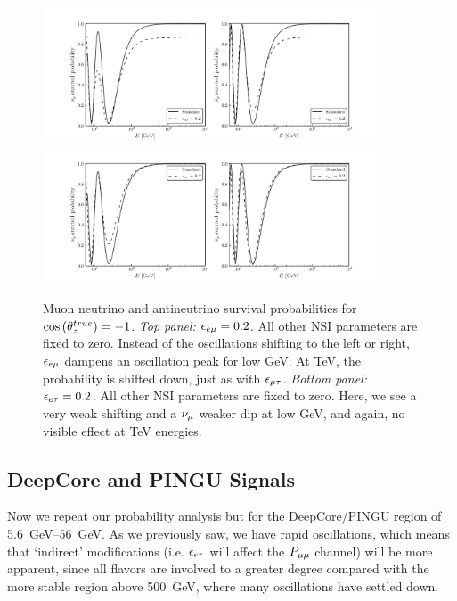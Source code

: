 \begin{figure}
    \begin{center}
        \includegraphics[width=0.9\textwidth]{figures/eem_probs.pdf}
        \includegraphics[width=0.9\textwidth]{figures/eet_probs.pdf}
        \caption{Muon neutrino and antineutrino survival probabilities for
        $\cos{(\theta_z^{true})} = -1$. \emph{Top panel:} $\epsilon_{e\mu} = 0.2$. All other NSI parameters are fixed to zero. Instead of the oscillations shifting to the left or right, $\epsilon_{e\mu}$ dampens an oscillation peak for low \si{\GeV}. At \si{\TeV}, the probability is shifted down, just as with $\epsilon_{\mu\tau}$.
        \emph{Bottom panel:} $\epsilon_{e\tau} = 0.2$. All other NSI parameters are fixed to zero. Here, we see a very weak shifting and a $\nu_\mu$ weaker dip at low \si{\GeV}, and again, no visible effect at \si{TeV} energies. }
        \label{fig:eem_eet_probs}
    \end{center}
\end{figure}


\subsection{DeepCore and PINGU Signals}
Now we repeat our probability analysis but for the DeepCore/PINGU region of \SIrange{5.6}{56}{\GeV}. As we previously saw,
we have rapid oscillations, which means that `indirect' modifications (i.e. $\epsilon_{e\tau}$ will affect the $P_{\mu\mu}$ channel)
will be more apparent, since all flavors are involved to a greater degree compared with the more stable region above \SI{500}{\GeV}, where 
many oscillations have settled down.

